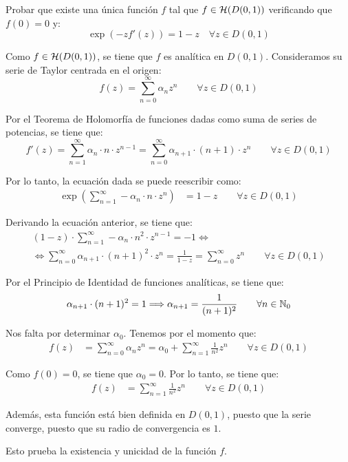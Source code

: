 \begin{ejercicio}
    Probar que existe una única función $f$ tal que $f \in \mathcal{H}(D(0,1))$ verificando que $f(0) = 0$ y:
    \begin{equation*}
        \exp\left({-z} f'(z)\right) = 1-z \quad \forall z \in D(0,1)
    \end{equation*}

    Como $f\in \mathcal{H}(D(0,1))$, se tiene que $f$ es analítica en $D(0,1)$. Consideramos su serie de Taylor centrada en el origen:
    \begin{equation*}
        f(z) = \sum_{n=0}^{\infty} \alpha_n z^n \qquad \forall z \in D(0,1)
    \end{equation*}

    Por el Teorema de Holomorfía de funciones dadas como suma de series de potencias, se tiene que:
    \begin{equation*}
        f'(z) = \sum_{n=1}^{\infty} \alpha_n\cdot n\cdot z^{n-1}
        = \sum_{n=0}^{\infty} \alpha_{n+1}\cdot (n+1)\cdot z^{n} \qquad \forall z \in D(0,1)
    \end{equation*}

    Por lo tanto, la ecuación dada se puede reescribir como:
    \begin{align*}
        \exp\left(\sum_{n=1}^{\infty} -\alpha_{n}\cdot n\cdot z^{n}\right) &= 1-z\qquad \forall z \in D(0,1)
    \end{align*}

    Derivando la ecuación anterior, se tiene que:
    \begin{multline*}
        (1-z)\cdot \sum_{n=1}^{\infty} -\alpha_{n}\cdot n^2\cdot z^{n-1} = -1
        \iff\\\iff \sum_{n=0}^{\infty} \alpha_{n+1}\cdot (n+1)^2\cdot z^{n} = \frac{1}{1-z}
        = \sum_{n=0}^{\infty} z^{n} \qquad \forall z \in D(0,1)
    \end{multline*}

    Por el Principio de Identidad de funciones analíticas, se tiene que:
    \begin{equation*}
        \alpha_{n+1}\cdot (n+1)^2 = 1\Longrightarrow \alpha_{n+1} = \frac{1}{(n+1)^2} \qquad \forall n \in \mathbb{N}_0
    \end{equation*}

    Nos falta por determinar $\alpha_0$. Tenemos por el momento que:
    \begin{align*}
        f(z) &= \sum_{n=0}^{\infty} \alpha_n z^n = \alpha_0 + \sum_{n=1}^{\infty} \frac{1}{n^2} z^n\qquad \forall z \in D(0,1)
    \end{align*}

    Como $f(0)=0$, se tiene que $\alpha_0=0$. Por lo tanto, se tiene que:
    \begin{align*}
        f(z) &= \sum_{n=1}^{\infty} \frac{1}{n^2} z^n\qquad \forall z \in D(0,1)
    \end{align*}

    Además, esta función está bien definida en $D(0,1)$, puesto que la serie converge, puesto que su radio de convergencia es $1$.

    Esto prueba la existencia y unicidad de la función $f$.
\end{ejercicio}

